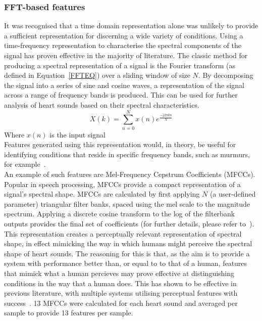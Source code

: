 \documentclass[titlepage, 12pt]{scrartcl} \usepackage{enumitem}
\begin{document}
\subsubsection{FFT-based features}\label{FFT}
It was recognised that a time domain representation alone was unlikely to
provide a sufficient representation for discerning a wide variety of
conditions. Using a time-frequency representation to characterise the spectral
components of the signal has proven effective in the majority of literature.
The classic method for producing a spectral representation of a signal is the
Fourier transform (as defined in Equation~\ref{FFTEQ}) over a sliding window of size
$N$. By decomposing the signal into a series of sine and cosine
waves, a representation of the signal across a range of frequency bands is
produced. This can be used for further analysis of heart sounds
based on their spectral characteristics.
\begin{equation}\label{FFTEQ}
X(k)=\sum\limits_{n=0}^{N}x(n)e^{\frac{-j2\pi kn}{N}}
\end{equation}
Where $x(n)$ is the input signal\\
Features generated using this representation would, in theory, be useful for
identifying conditions that reside in specific frequency bands, such as
murmurs, for example~\parencite{Sepehri2010}.\\

An example of such features are Mel-Frequency Cepstrum Coefficients (MFCCs).
Popular in speech processing, MFCCs provide a compact representation of a
signal's spectral shape. MFCCs are calculated by first applying $N$ (a
user-defined parameter) triangular filter banks, spaced using the mel scale to
the magnitude spectrum. Applying a discrete cosine transform to the log of the
filterbank outputs provides the final set of coefficients (for further details,
please refer to~\parencite{Lerch2012}). This representation
creates a perceptually relevant representation of spectral shape, in effect
mimicking the way in which humans might perceive the spectral shape of heart
sounds. The reasoning for this is that, as the aim is to provide a system with
performance better than, or equal to to that of a human, features that mimick
what a human percieves may prove effective at distinguishing conditions in the
way that a human does. This has shown to be effective in previous literature,
with multiple systems utilising perceptual features with
success~\parencite{Ortiz2016, Rubin2016, Quiceno-Manrique2010a}. 13 MFCCs were
calculated for each heart sound and averaged per sample to provide 13 features
per sample.\\
\end{document}
